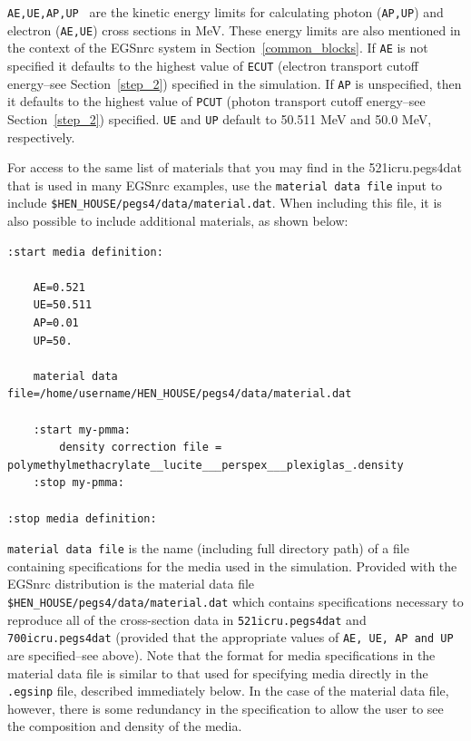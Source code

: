 \begin{description}
\item {\tt AE,UE,AP,UP } are the kinetic energy limits for calculating photon ({\tt AP,UP}) and electron ({\tt AE,UE}) cross sections in
MeV.  These energy limits are also mentioned in the context of the EGSnrc system in Section~\ref{common_blocks}.
If {\tt AE} is
not specified it defaults to the highest value of {\tt ECUT} (electron transport cutoff energy--see Section~\ref{step_2}) specified
in the simulation.  If
{\tt AP} is unspecified, then it defaults to the highest value of {\tt PCUT} (photon transport cutoff energy--see Section~\ref{step_2})
specified.  {\tt UE} and {\tt UP} default to 50.511 MeV and 50.0 MeV, respectively.

For access to the same list of materials that you may find in the 521icru.pegs4dat that is used in many EGSnrc examples, use the {\tt material data file} input to include {\tt \$HEN\_HOUSE/pegs4/data/material.dat}. When including this file, it is also possible to include additional materials, as shown below:

\begin{verbatim}
:start media definition:

    AE=0.521
    UE=50.511
    AP=0.01
    UP=50.

    material data file=/home/username/HEN_HOUSE/pegs4/data/material.dat

    :start my-pmma:
        density correction file = polymethylmethacrylate__lucite___perspex___plexiglas_.density
    :stop my-pmma:

:stop media definition:
\end{verbatim}

\item {\tt material data file} is the name (including full directory path) of a file containing specifications for the media used
in the simulation.  Provided with the EGSnrc distribution is the material data file {\tt \$HEN\_HOUSE/pegs4/data/material.dat} which
contains specifications necessary to reproduce all of the cross-section data in {\tt 521icru.pegs4dat} and {\tt 700icru.pegs4dat}
(provided that the appropriate values of {\tt AE, UE, AP and UP} are specified--see above).  Note that the format for
media specifications in the material data file is similar to that used for specifying media directly in the
{\tt .egsinp} file, described immediately below.  In the case of the material data file, however, there is some redundancy in the specification to allow the
user to see the composition and density of the media.


\end{description}
